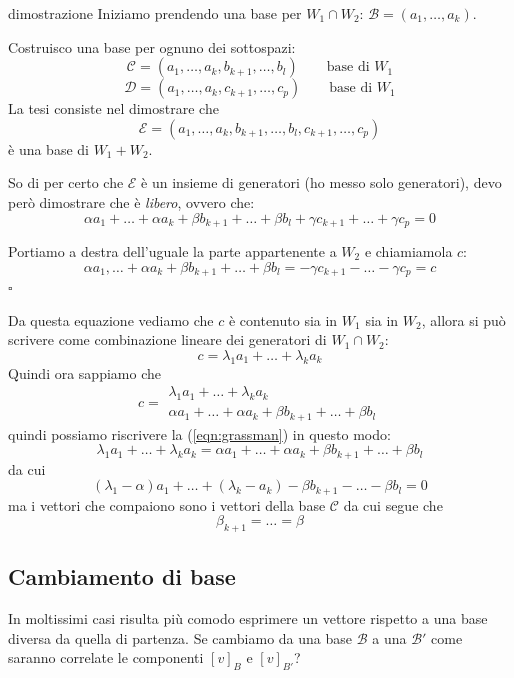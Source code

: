 \documentclass[x11names]{article}
\newcommand*{\QEDB}{\null\nobreak\hfill\ensuremath{\square}}%
\begin{document}
\begin{es}{dimostrazione}
	Iniziamo prendendo una base per $W_{1} \cap W_{2}$: $\mathcal{B} = \left(a_{1},\dots,a_{k}\right)$.
	
	Costruisco una base per ognuno dei sottospazi:
	\[
	\mathcal{C} = \left(a_{1},\dots,a_{k},b_{k+1},\dots,b_{l}\right) \qquad \text{base di } W_{1}
	\]
	\[
	\mathcal{D} = \left(a_{1},\dots,a_{k},c_{k+1},\dots,c_{p}\right) \qquad \text{base di } W_{1}
	\]
	La tesi consiste nel dimostrare che 
	\[
	\mathcal{E} = \left(a_{1},\dots,a_{k},b_{k+1},\dots,b_{l},c_{k+1},\dots,c_{p}\right)
	\]
	è una base di $W_{1} + W_{2}$.
	
	So di per certo che $\mathcal{E}$ è un insieme di generatori (ho messo solo generatori), devo però dimostrare che è \textit{libero}, ovvero che:
	\begin{equation}
		\label{eqn:grassman}
		\alpha a_{1} + \dots + \alpha a_{k} + \beta b_{k+1} + \dots + \beta b_{l} + \gamma c_{k+1} + \dots + \gamma c_{p} = 0
	\end{equation}

	Portiamo a destra dell'uguale la parte appartenente a $W_{2}$ e chiamiamola $c$:
	\[
	\alpha a_{1},\dots + \alpha a_{k} + \beta b_{k+1} + \dots + \beta b_{l} = -\gamma c_{k+1} -\dots -\gamma c_{p} = c
	\] \QEDB
\end{es}
\begin{es}{}
	Da questa equazione vediamo che $c$ è contenuto sia in $W_{1}$ sia in $W_{2}$, allora si può scrivere come combinazione lineare dei generatori di $W_{1} \cap W_{2}$:
	\[
	c = \lambda_1 a_{1} + \dots + \lambda_k a_{k}
	\]
	Quindi ora sappiamo che 
	\[
	c = \begin{array}{l}
		\lambda_1 a_{1} + \dots + \lambda_k a_{k} \\
		\alpha a_{1} +\dots + \alpha a_{k} +\beta b_{k+1} + \dots + \beta b_{l} 
	\end{array}
	\]
	quindi possiamo riscrivere la (\ref{eqn:grassman}) in questo modo:
	\[
	\lambda_1 a_{1} + \dots + \lambda_k a_{k} = \alpha a_{1} + \dots + \alpha a_{k} + \beta b_{k+1} + \dots + \beta b_{l} 
	\]
	da cui
	\[
	(\lambda_1 - \alpha)a_{1} + \dots + (\lambda_k - a_{k}) - \beta b_{k+1} - \dots - \beta b_{l} = 0
	\]
	ma i vettori che compaiono sono i vettori della base $\mathcal{C}$ da cui segue che 
	\[
	\beta_{k+1} = \dots = \beta
	\]
\end{es}

\subsection{Cambiamento di base}
In moltissimi casi risulta più comodo esprimere un vettore rispetto a una base diversa da quella di partenza. Se cambiamo da una base $\mathscr{B}$ a una $\mathscr{B}'$ come saranno correlate le componenti $\left[v\right]_{B}$ e $\left[v\right]_{B'}$?
\end{document}

